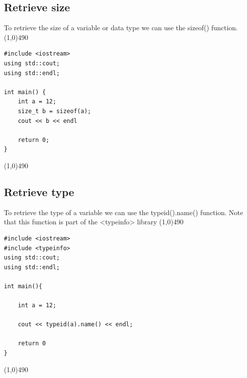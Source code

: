 \documentclass{report}
\begin{document}
    \pagebreak \bigbreak \noindent 
    \subsection{Retrieve size}
    \bigbreak \noindent 
    To retrieve the size of a variable or data type we can use the sizeof() function.
    \bigbreak \noindent 
    \line(1,0){490}
    \begin{verbatim}
#include <iostream>
using std::cout;
using std::endl;

int main() {
    int a = 12;
    size_t b = sizeof(a);
    cout << b << endl

    return 0;
}
    \end{verbatim}
    \line(1,0){490}
    \bigbreak \noindent 

    \bigbreak \noindent \bigbreak \noindent 
    \subsection{Retrieve type}
    \bigbreak \noindent 
    To retrieve the type of a variable we can use the typeid().name() function. Note that this function is part of the <typeinfo> library
    \bigbreak \noindent 
    \line(1,0){490}
    \begin{verbatim}
#include <iostream>
#include <typeinfo>
using std::cout;
using std::endl;

int main(){

    int a = 12;

    cout << typeid(a).name() << endl;

    return 0
}
    \end{verbatim}
    \line(1,0){490}
    \pagebreak \bigbreak \noindent 
\end{document}
